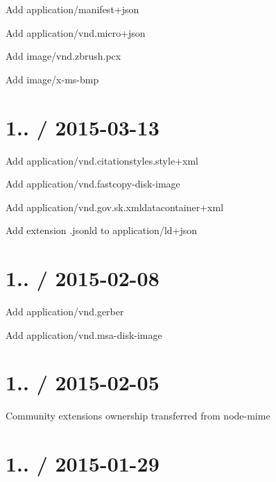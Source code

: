 \begin{DoxyItemize}
\item Add {\ttfamily application/manifest+json}
\item Add {\ttfamily application/vnd.\+micro+json}
\item Add {\ttfamily image/vnd.\+zbrush.\+pcx}
\item Add {\ttfamily image/x-\/ms-\/bmp}
\end{DoxyItemize}

\section*{1.. / 2015-\/03-\/13 }


\begin{DoxyItemize}
\item Add {\ttfamily application/vnd.\+citationstyles.\+style+xml}
\item Add {\ttfamily application/vnd.\+fastcopy-\/disk-\/image}
\item Add {\ttfamily application/vnd.\+gov.\+sk.\+xmldatacontainer+xml}
\item Add extension {\ttfamily .jsonld} to {\ttfamily application/ld+json}
\end{DoxyItemize}

\section*{1.. / 2015-\/02-\/08 }


\begin{DoxyItemize}
\item Add {\ttfamily application/vnd.\+gerber}
\item Add {\ttfamily application/vnd.\+msa-\/disk-\/image}
\end{DoxyItemize}

\section*{1.. / 2015-\/02-\/05 }


\begin{DoxyItemize}
\item Community extensions ownership transferred from {\ttfamily node-\/mime}
\end{DoxyItemize}

\section*{1.. / 2015-\/01-\/29 }


